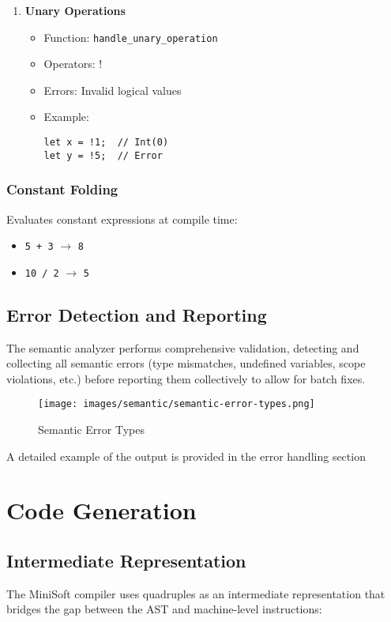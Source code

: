 \documentclass[12pt,a4paper]{article}
\begin{document}
\begin{enumerate}
	\item \textbf{Unary Operations}
	      \begin{itemize}
		      \item Function: \texttt{handle\_unary\_operation}
		      \item Operators: !
		      \item Errors: Invalid logical values
		      \item Example:
		            \begin{lstlisting}
let x = !1;  // Int(0)
let y = !5;  // Error
        \end{lstlisting}
	      \end{itemize}
\end{enumerate}


\subsubsection*{Constant Folding}
Evaluates constant expressions at compile time:
\begin{itemize}
	\item \texttt{5 + 3} $\rightarrow$ \texttt{8}
	\item \texttt{10 / 2} $\rightarrow$ \texttt{5}
\end{itemize}


\subsection{Error Detection and Reporting}
The semantic analyzer performs comprehensive validation, detecting and collecting all semantic errors (type mismatches, undefined variables, scope violations, etc.) before reporting them collectively to allow for batch fixes.

\begin{figure}[H]
	\centering
	\texttt{[image: images/semantic/semantic-error-types.png]}
	\caption{Semantic Error Types}
\end{figure}

A detailed example of the output is provided in the error handling section

\section{Code Generation}
\subsection{Intermediate Representation}
The MiniSoft compiler uses quadruples as an intermediate representation that bridges the gap between the AST and machine-level instructions:
\end{document}
